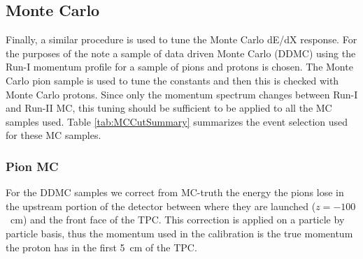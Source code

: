 \clearpage

\subsection{Monte Carlo}\label{sec:MCResults}

Finally, a similar procedure is used to tune the Monte Carlo dE/dX response. For the purposes of the note a sample of data driven Monte Carlo (DDMC) using the Run-I momentum profile  for a sample of pions and protons is chosen. The Monte Carlo pion sample is used to tune the constants and then this is checked with Monte Carlo protons. Since only the momentum spectrum changes between Run-I and Run-II MC, this tuning should be sufficient to be applied to all the MC samples used. Table \ref{tab:MCCutSummary} summarizes the event selection used for these MC samples.

\begin{table}[htb]
	\begin{center}
	\caption{Summary of Monte Carlo event selection applied to the calibration sample.} \label{tab:MCCutSummary}
	\end{center}
\end{table}

\subsubsection{Pion MC}\label{sec:Pion MC}

For the DDMC samples we correct from MC-truth the energy the pions lose in the upstream portion of the detector between where they are launched ($z=-100$~cm) and the front face of the TPC. This correction is applied on a particle by particle basis, thus the momentum used in the calibration is the true momentum the proton has in the first 5~cm of the TPC.

